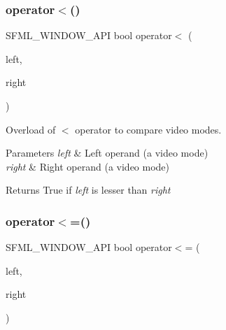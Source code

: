 \subsubsection{\texorpdfstring{operator$<$()}{operator<()}}
{\footnotesize\ttfamily S\+F\+M\+L\+\_\+\+W\+I\+N\+D\+O\+W\+\_\+\+A\+PI bool operator$<$ (\begin{DoxyParamCaption}\item[{const \mbox{\hyperlink{classsf_1_1_video_mode}{Video\+Mode}} \&}]{left,  }\item[{const \mbox{\hyperlink{classsf_1_1_video_mode}{Video\+Mode}} \&}]{right }\end{DoxyParamCaption})\hspace{0.3cm}{\ttfamily [related]}}



Overload of $<$ operator to compare video modes. 


\begin{DoxyParams}{Parameters}
{\em left} & Left operand (a video mode) \\
\hline
{\em right} & Right operand (a video mode)\\
\hline
\end{DoxyParams}
\begin{DoxyReturn}{Returns}
True if {\itshape left} is lesser than {\itshape right} \begin{DoxyVerb}\end{DoxyVerb}
 
\end{DoxyReturn}
\mbox{\label{classsf_1_1_video_mode_a09b0a83f9135d934e540800bad12f0ca}} 
\subsubsection{\texorpdfstring{operator$<$=()}{operator<=()}}
{\footnotesize\ttfamily S\+F\+M\+L\+\_\+\+W\+I\+N\+D\+O\+W\+\_\+\+A\+PI bool operator$<$= (\begin{DoxyParamCaption}\item[{const \mbox{\hyperlink{classsf_1_1_video_mode}{Video\+Mode}} \&}]{left,  }\item[{const \mbox{\hyperlink{classsf_1_1_video_mode}{Video\+Mode}} \&}]{right }\end{DoxyParamCaption})\hspace{0.3cm}{\ttfamily [related]}}



